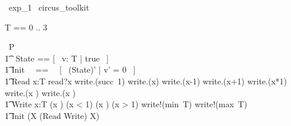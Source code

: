 
\begin{zsection}
  \SECTION\ exp\_1 \parents\ circus\_toolkit
\end{zsection}

\begin{zed}
	T == 0 .. 3 \\
\end{zed}


\begin{circus}
    \circprocess\ P \circdef \circbegin \\
        \t1 \circstate\ State == [~ v: T | true ~] \\
        \t1 Init ~~==~~ [~ (State)' | v' = 0 ~] \\
        \t1 Read \circdef \circvar x:T \circspot read?x \then write.(succ~1) \then write.(\negate x) \then write.(x-1) \then write.(x+1) \then write.(x*1) \then write.(x ) \then write.(x ) \then \Skip \\
        \t1 Write \circdef \circvar x:T \circspot \lcircguard (x ) \land (x < 1) \land (x ) \land (x > 1) \rcircguard \circguard write!(min~T) \then write!(max~T) \then \Skip \\
        \t1 \circspot \lschexpract Init \rschexpract \circseq (\circmu X \circspot (Read \extchoice Write) \circseq X) \\ 
	\circend
\end{circus}

